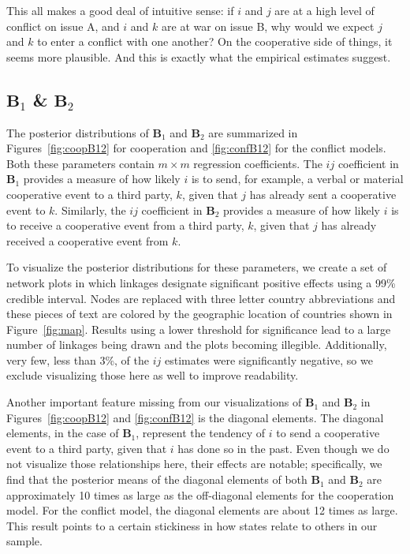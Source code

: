 \documentclass[3p,times,twocolumn,authoryear,12pt]{elsarticle}
\newcommand{\bl}[1]{{\mathbf #1}}
\begin{document}
This all makes a good deal of intuitive sense: if $i$ and $j$ are at a high level of conflict on issue A, and $i$ and $k$ are at war on issue B, why would we expect $j$ and $k$ to enter a conflict with one another? On the cooperative side of things, it seems more plausible. And this is exactly what the empirical estimates suggest.

\subsection{$\bl B_{1}$ \& $\bl B_{2}$} %


The posterior distributions of $\bl B_{1}$ and $\bl B_{2}$ are summarized in Figures~\ref{fig:coopB12} for cooperation and \ref{fig:confB12} for the conflict models. Both these parameters contain $m \times m$ regression coefficients. The $ij$ coefficient in $\bl B_{1}$ provides a measure of how likely $i$ is to send, for example, a verbal or material cooperative event to a third party, $k$, given that $j$ has already sent a cooperative event to $k$. Similarly, the $ij$ coefficient in $\bl B_{2}$ provides a measure of how likely $i$ is to receive a cooperative event from a third party, $k$, given that $j$ has already received a cooperative event from $k$. 

To visualize the posterior distributions for these parameters, we create a set of network plots in which linkages designate significant positive effects using a 99\% credible interval. Nodes are replaced with three letter country abbreviations and these pieces of text are colored by the geographic location of countries shown in Figure~\ref{fig:map}. Results using a lower threshold for significance lead to a large number of linkages being drawn and the plots becoming illegible. Additionally, very few, less than 3\%, of the $ij$ estimates were significantly negative, so we exclude visualizing those here as well to improve readability. 

Another important feature missing from our visualizations of $\bl B_{1}$ and $\bl B_{2}$ in Figures~\ref{fig:coopB12} and \ref{fig:confB12} is the diagonal elements. The diagonal elements, in the case of $\bl B_{1}$, represent the tendency of $i$ to send a cooperative event to a third party, given that $i$ has done so in the past. Even though we do not visualize those relationships here, their effects are notable; specifically, we find that the posterior means of the diagonal elements of both $\bl B_{1}$ and $\bl B_{2}$ are approximately 10 times as large as the off-diagonal elements for the cooperation model. For the conflict model, the diagonal elements are about 12 times as large. This result points to a certain stickiness in how states relate to others in our sample. 
\end{document}
